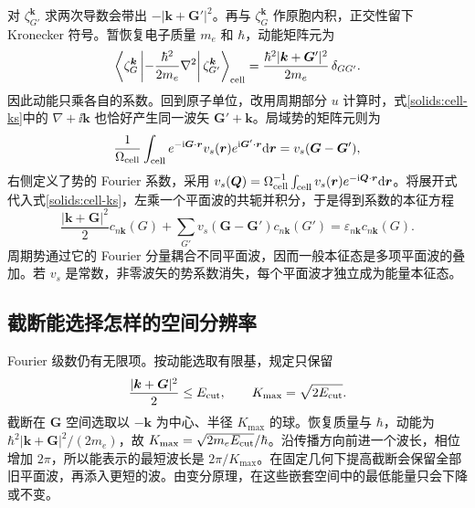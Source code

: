 对 $\zeta^{\bm k}_{G'}$ 求两次导数会带出 $-|\bm k+\bm G'|^2$。再与 $\zeta^{\bm k}_{G}$ 作原胞内积，正交性留下 Kronecker 符号。暂恢复电子质量 $m_e$ 和 $\hbar$，动能矩阵元为
\begin{equation}\label{solids:bloch-kinetic}
\left\langle\zeta^{\bm k}_{G}\left|-\frac{\hbar^2}{2m_e}\nabla^2\right|
\zeta^{\bm k}_{G'}\right\rangle_{\rm cell}
=\frac{\hbar^2|\bm k+\bm G'|^2}{2m_e}\,\delta_{GG'} .
\end{equation}
因此动能只乘各自的系数。回到原子单位，改用周期部分 $u$ 计算时，式\eqref{solids:cell-ks}中的 $\nabla+\ii\bm k$ 也恰好产生同一波矢 $\bm G'+\bm k$。局域势的矩阵元则为
\begin{equation}
\frac1{\Omega_{\rm cell}}\int_{\rm cell}
e^{-\mathrm{i}\bm G\cdot\bm r}v_s(\bm r)e^{\mathrm{i}\bm G'\cdot\bm r}\mathrm{d}\bm r
=v_s(\bm G-\bm G'),
\end{equation}
右侧定义了势的 Fourier 系数，采用 $v_s(\bm Q)=\Omega_{\rm cell}^{-1}\int_{\rm cell}v_s(\bm r)e^{-\mathrm{i}\bm Q\cdot\bm r}\mathrm{d}\bm r$。将展开式代入式\eqref{solids:cell-ks}，左乘一个平面波的共轭并积分，于是得到系数的本征方程
\begin{equation}\label{solids:pw-matrix}
\frac{|\bm k+\bm G|^2}{2}c_{n\bm k}(G)
+\sum_{G'}v_s(\bm G-\bm G')c_{n\bm k}(G')
=\varepsilon_{n\bm k}c_{n\bm k}(G).
\end{equation}
周期势通过它的 Fourier 分量耦合不同平面波，因而一般本征态是多项平面波的叠加。若 $v_s$ 是常数，非零波矢的势系数消失，每个平面波才独立成为能量本征态。

\subsection{截断能选择怎样的空间分辨率}
Fourier 级数仍有无限项。按动能选取有限基，规定只保留
\begin{equation}\label{solids:wave-cutoff}
\frac{|\bm k+\bm G|^2}{2}\le E_{\rm cut},\qquad
K_{\max}=\sqrt{2E_{\rm cut}}.
\end{equation}
截断在 $\bm G$ 空间选取以 $-\bm k$ 为中心、半径 $K_{\max}$ 的球。恢复质量与 $\hbar$，动能为 $\hbar^2|\bm k+\bm G|^2/(2m_e)$，故 $K_{\max}=\sqrt{2m_eE_{\rm cut}}/\hbar$。沿传播方向前进一个波长，相位增加 $2\pi$，所以能表示的最短波长是 $2\pi/K_{\max}$。在固定几何下提高截断会保留全部旧平面波，再添入更短的波。由变分原理，在这些嵌套空间中的最低能量只会下降或不变。

